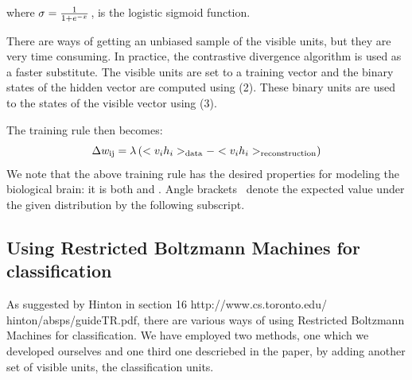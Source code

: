 where $\sigma = \frac{1}{1  + e^{- x}}^{}$, is the logistic sigmoid
function.

There are ways of getting an unbiased sample of the visible units, but they
are very time consuming. In practice, the contrastive divergence algorithm is
used as a faster substitute. The visible units are set to a training vector
and the binary states of the hidden vector are computed using (2). These
binary units are used to  the states of the visible
vector using (3).

The training rule then becomes:
\[ \Delta w_{\operatorname{ij}} = \lambda \left( < v_i h_i >_{\operatorname{data}} - < v_i h_i
   >_{\operatorname{reconstruction}} \right) \]
We note that the above training rule has the desired properties for modeling
the biological brain: it is both  and .
Angle brackets \ denote the expected value under the given distribution by the
following subscript.



\subsection{Using Restricted Boltzmann Machines for classification}

As suggested by Hinton in section 16 http://www.cs.toronto.edu/\~{
}hinton/absps/guideTR.pdf, there are various ways of using Restricted
Boltzmann Machines for classification. We have employed two methods, one which
we developed ourselves and one third one descriebed in the paper, by adding
another set of visible units, the classification units.



